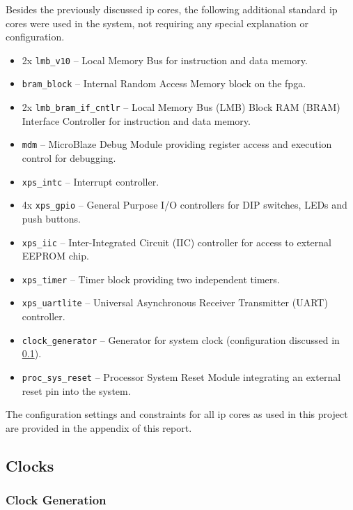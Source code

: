 Besides the previously discussed \gls{ip} cores, the following additional standard \gls{ip} cores were used in the system, not requiring any special explanation or configuration.

\begin{itemize}
  \setlength{\itemsep}{1pt}
  \setlength{\parskip}{2pt}
  \setlength{\parsep}{0pt}
\item 2x \texttt{lmb\_v10} -- Local Memory Bus for instruction and data memory.
\item \texttt{bram\_block} -- Internal Random Access Memory block on the \gls{fpga}.
\item 2x \texttt{lmb\_bram\_if\_cntlr} -- Local Memory Bus (LMB) Block RAM (BRAM) Interface Controller for instruction and data memory.
\item \texttt{mdm} -- MicroBlaze Debug Module providing register access and execution control for debugging.
\item \texttt{xps\_intc} -- Interrupt controller.
\item 4x \texttt{xps\_gpio} -- General Purpose I/O controllers for DIP switches, LEDs and push buttons.
\item \texttt{xps\_iic} -- Inter-Integrated Circuit (IIC) controller for access to external EEPROM chip.
\item \texttt{xps\_timer} -- Timer block providing two independent timers.
\item \texttt{xps\_uartlite} -- Universal Asynchronous Receiver Transmitter (UART) controller.
\item \texttt{clock\_generator} -- Generator for system clock (configuration discussed in \ref{sec:clocks}).
\item \texttt{proc\_sys\_reset} -- Processor System Reset Module integrating an external reset pin into the system.
\end{itemize}

The configuration settings and constraints for all \gls{ip} cores as used in this project are provided in the appendix of this report.

\subsection{Clocks}
\label{sec:clocks}

\subsubsection{Clock Generation}

